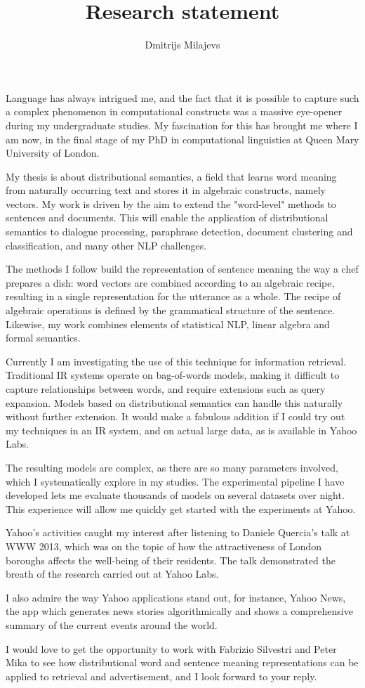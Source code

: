 \documentclass[11pt]{article}
\title{Research statement}
\author{
Dmitrijs Milajevs \\
}
\date{}
\begin{document}
\maketitle

\thispagestyle{empty}

Language has always intrigued me, and the fact that it is possible to capture such a complex phenomenon in computational constructs was a massive eye-opener during my undergraduate studies. My fascination for this has brought me where I am now, in the final stage of my PhD in computational linguistics at Queen Mary University of London.

My thesis is about distributional semantics, a field that learns word meaning from naturally occurring text and stores it in algebraic constructs, namely vectors. My work is driven by the aim to extend the "word-level" methods to sentences and documents. This will enable the application of distributional semantics to dialogue processing, paraphrase detection, document clustering and classification, and many other NLP challenges.

The methods I follow build the representation of sentence meaning the way a chef prepares a dish: word vectors are combined according to an algebraic recipe, resulting in a single representation for the utterance as a whole. The recipe of algebraic operations is defined by the grammatical structure of the sentence. Likewise, my work combines elements of statistical NLP, linear algebra and formal semantics.

Currently I am investigating the use of this technique for information retrieval. Traditional IR systems operate on bag-of-words models, making it difficult to capture relationships between words, and require extensions such as query expansion. Models based on distributional semantics can handle this naturally without further extension. It would make a fabulous addition if I could try out my techniques in an IR system, and on actual large data, as is available in Yahoo Labs.

The resulting models are complex, as there are so many parameters involved, which I systematically explore in my studies. The experimental pipeline I have developed lets me evaluate thousands of models on several datasets over night. This experience will allow me quickly get started with the experiments at Yahoo.

Yahoo's activities caught my interest after listening to Daniele Quercia's talk at WWW 2013, which was on the topic of how the attractiveness of London boroughs affects the well-being of their residents. The talk demonstrated the breath of the research carried out at Yahoo Labs.

I also admire the way Yahoo applications stand out, for instance, Yahoo News, the app which generates news stories algorithmically and shows a comprehensive summary of the current events around the world.

I would love to get the opportunity to work with Fabrizio Silvestri and Peter Mika to see how distributional word and sentence meaning representations can be applied to retrieval and advertisement, and I look forward to your reply.
\end{document}
